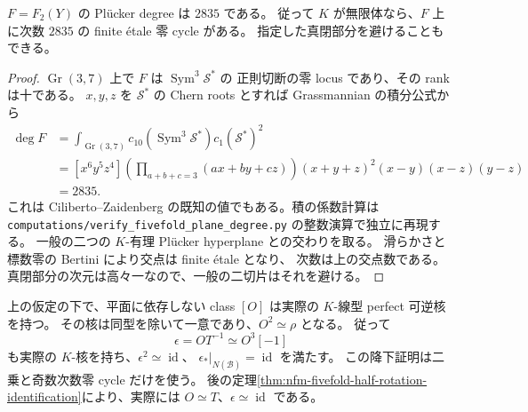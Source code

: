 \begin{lemma}
\label{lem:nfm-fivefold-plane-odd-degree}
$F=F_2(Y)$ の Pl\"ucker degree は $2835$ である。
従って $K$ が無限体なら、$F$ 上に次数 $2835$ の finite \'etale 零 cycle がある。
指定した真閉部分を避けることもできる。
\end{lemma}

\begin{proof}
$\operatorname{Gr}(3,7)$ 上で $F$ は $\operatorname{Sym}^3\mathcal S^*$ の
正則切断の零 locus であり、その rank は十である。
$x,y,z$ を $\mathcal S^*$ の Chern roots とすれば Grassmannian の積分公式から
\begin{align*}
 \deg F
 &=\int_{\operatorname{Gr}(3,7)}
 c_{10}(\operatorname{Sym}^3\mathcal S^*)c_1(\mathcal S^*)^2\\
 &=[x^6y^5z^4]
 \left(\prod_{a+b+c=3}(ax+by+cz)\right)
 (x+y+z)^2(x-y)(x-z)(y-z)\\
 &=2835.
\end{align*}
これは Ciliberto--Zaidenberg\cite[Example~4.4]{NFMCilibertoZaidenbergFano}
の既知の値でもある。積の係数計算は
\texttt{computations/verify\_fivefold\_plane\_degree.py} の整数演算で独立に再現する。
一般の二つの $K$-有理 Pl\"ucker hyperplane との交わりを取る。
滑らかさと標数零の Bertini により交点は finite \'etale となり、
次数は上の交点数である。真閉部分の次元は高々一なので、一般の二切片はそれを避ける。
\end{proof}

\begin{theorem}
\label{thm:nfm-fivefold-half-rotation-kernel-descent}
上の仮定の下で、平面に依存しない class $[O]$ は実際の $K$-線型 perfect 可逆核を持つ。
その核は同型を除いて一意であり、$O^2\simeq\rho$ となる。
従って
\[
 \epsilon=OT^{-1}\simeq O^3[-1]
\]
も実際の $K$-核を持ち、$\epsilon^2\simeq\operatorname{id}$、
$\epsilon_*|_{N(\mathcal B)}=\operatorname{id}$ を満たす。
この降下証明は二乗と奇数次数零 cycle だけを使う。
後の定理\ref{thm:nfm-fivefold-half-rotation-identification}により、実際には
$O\simeq T$、$\epsilon\simeq\operatorname{id}$ である。
\end{theorem}

